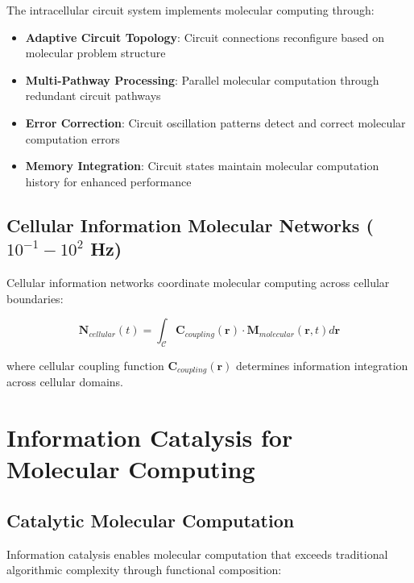 \documentclass[12pt,a4paper]{article}
\begin{document}
The intracellular circuit system implements molecular computing through:

\begin{itemize}
\item \textbf{Adaptive Circuit Topology}: Circuit connections reconfigure based on molecular problem structure
\item \textbf{Multi-Pathway Processing}: Parallel molecular computation through redundant circuit pathways
\item \textbf{Error Correction}: Circuit oscillation patterns detect and correct molecular computation errors
\item \textbf{Memory Integration}: Circuit states maintain molecular computation history for enhanced performance
\end{itemize}

\subsection{Cellular Information Molecular Networks ($10^{-1}-10^2$ Hz)}

Cellular information networks coordinate molecular computing across cellular boundaries:

\begin{equation}
\mathbf{N}_{cellular}(t) = \int_{\mathcal{C}} \mathbf{C}_{coupling}(\mathbf{r}) \cdot \mathbf{M}_{molecular}(\mathbf{r}, t) d\mathbf{r}
\end{equation}

where cellular coupling function $\mathbf{C}_{coupling}(\mathbf{r})$ determines information integration across cellular domains.

\section{Information Catalysis for Molecular Computing}

\subsection{Catalytic Molecular Computation}

Information catalysis enables molecular computation that exceeds traditional algorithmic complexity through functional composition:
\end{document}
